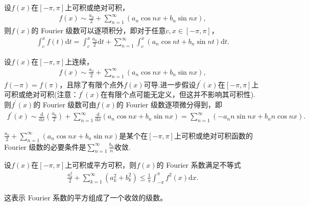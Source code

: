 \documentclass[../../main.tex]{subfiles}%
\begin{document}
\begin{theorem}[Fourier级数的逐项积分定理]\label{theorem:Fourier级数的逐项积分定理}
设$f(x)$在$[-\pi,\pi]$上可积或绝对可积，
\begin{align*}
f(x)\sim\frac{a_0}{2}+\sum_{n = 1}^{\infty}(a_n\cos nx + b_n\sin nx),
\end{align*}
则$f(x)$的 Fourier 级数可以逐项积分，即对于任意$c,x\in[-\pi,\pi]$，
\begin{align*}
\int_{c}^{x}f(t)\mathrm{d}t=\int_{c}^{x}\frac{a_0}{2}\mathrm{d}t+\sum_{n = 1}^{\infty}\int_{c}^{x}(a_n\cos nt + b_n\sin nt)\mathrm{d}t.
\end{align*}
\end{theorem}

\begin{theorem}[Fourier级数的逐项微分定理]\label{theorem:Fourier级数的逐项微分定理}
设$f(x)$在$[-\pi,\pi]$上连续，
\begin{align*}
f(x)\sim\frac{a_0}{2}+\sum_{n = 1}^{\infty}(a_n\cos nx + b_n\sin nx),
\end{align*}
$f(-\pi)=f(\pi)$，且除了有限个点外$f(x)$可导.进一步假设$f^{\prime}(x)$在$[-\pi,\pi]$上可积或绝对可积(注意：$f^{\prime}(x)$在有限个点可能无定义，但这并不影响其可积性). 则$f^{\prime}(x)$的 Fourier 级数可由$f(x)$的 Fourier 级数逐项微分得到，即
\begin{align*}
f^{\prime}(x)\sim\frac{\mathrm{d}}{\mathrm{d}x}\left(\frac{a_0}{2}\right)+\sum_{n = 1}^{\infty}\frac{\mathrm{d}}{\mathrm{d}x}(a_n\cos nx + b_n\sin nx)=\sum_{n = 1}^{\infty}(-a_nn\sin nx + b_nn\cos nx).
\end{align*}
\end{theorem}

\begin{corollary}
$\frac{a_0}{2}+\sum_{n = 1}^{\infty}(a_n\cos nx + b_n\sin nx)$是某个在$[-\pi,\pi]$上可积或绝对可积函数的 Fourier 级数的必要条件是$\sum_{n = 1}^{\infty}\frac{b_n}{n}$收敛. 
\end{corollary}

\begin{theorem}[Bessel不等式]\label{theorem:Bessel不等式}
设$f(x)$在$[-\pi,\pi]$上可积或平方可积，则$f(x)$的 Fourier 系数满足不等式
\begin{align*}
\frac{a_0^2}{2}+\sum_{k = 1}^{\infty}(a_k^2 + b_k^2)\leqslant \frac{1}{\pi}\int_{-\pi}^{\pi}f^2(x)\mathrm{d}x.
\end{align*}
\end{theorem}
\begin{note}
这表示 Fourier 系数的平方组成了一个收敛的级数。
\end{note}
\end{document}
